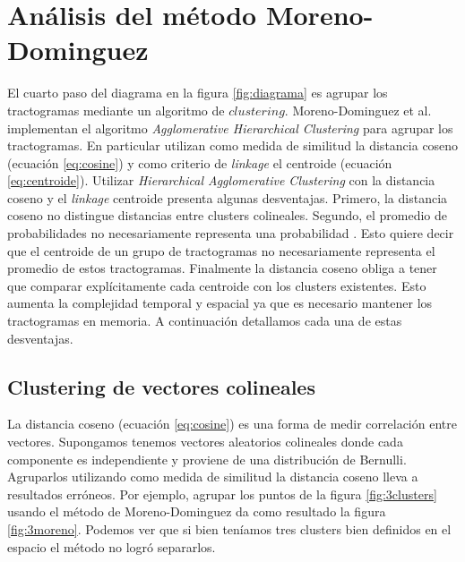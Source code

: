 \section{An\'alisis del m\'etodo Moreno-Dominguez}
\label{sec:analisis_moreno}

El cuarto paso del diagrama en la figura \ref{fig:diagrama} es agrupar los
tractogramas mediante un algoritmo de $clustering$. Moreno-Dominguez et
al. \cite{Moreno-Dominguez2014} implementan el algoritmo
\textit{Agglomerative Hierarchical Clustering} para agrupar los
tractogramas. En particular utilizan como medida de similitud la distancia
coseno (ecuaci\'on \ref{eq:cosine}) y como criterio de \textit{linkage} el
centroide (ecuaci\'on \ref{eq:centroide}). Utilizar \textit{Hierarchical
Agglomerative Clustering} con la distancia coseno y el \textit{linkage}
centroide presenta algunas desventajas. Primero, la distancia coseno no
distingue distancias entre clusters colineales. Segundo, el promedio de
probabilidades no necesariamente representa una probabilidad 
\cite{Pohl2007}. Esto quiere decir que el centroide de un grupo de
tractogramas no necesariamente representa el promedio de estos
tractogramas. Finalmente la distancia coseno obliga a tener que comparar
expl\'icitamente cada centroide con los clusters existentes. Esto aumenta
la complejidad temporal y espacial ya que es necesario mantener los
tractogramas en memoria. A continuaci\'on detallamos cada una de estas
desventajas. \\

\subsection{Clustering de vectores colineales}

La distancia coseno (ecuaci\'on \ref{eq:cosine}) es una forma de medir 
correlaci\'on entre vectores. Supongamos tenemos
vectores aleatorios colineales donde cada componente es independiente y 
proviene de una distribuci\'on de Bernulli. Agruparlos utilizando como
medida de similitud la distancia coseno lleva a resultados err\'oneos. 
Por ejemplo, agrupar los puntos de la figura \ref{fig:3clusters} usando
el m\'etodo de Moreno-Dominguez da como resultado la figura 
\ref{fig:3moreno}. Podemos ver que si bien ten\'iamos tres clusters bien
definidos en el espacio el m\'etodo no logr\'o separarlos. \\

